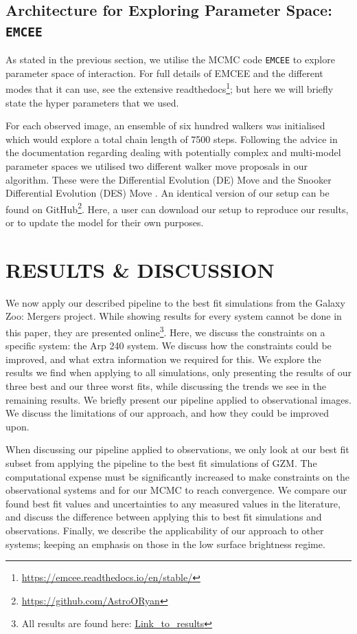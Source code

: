 \subsection{Architecture for Exploring Parameter Space: \texttt{EMCEE}}
As stated in the previous section, we utilise the MCMC code \texttt{EMCEE} \citep{Foreman-Mackey_13} to explore parameter space of interaction. For full details of EMCEE and the different modes that it can use, see the extensive readthedocs\footnote{\url{https://emcee.readthedocs.io/en/stable/}}; but here we will briefly state the hyper parameters that we used. 

For each observed image, an ensemble of six hundred walkers was initialised which would explore a total chain length of 7500 steps. Following the advice in the documentation regarding dealing with potentially complex and multi-model parameter spaces we utilised two different walker move proposals in our algorithm. These were the Differential Evolution (DE) Move \citep{Nelson_14} and the Snooker Differential Evolution (DES) Move \citep{ter_Braak_08}. An identical version of our setup can be found on GitHub\footnote{\url{https://github.com/AstroORyan}}. Here, a user can download our setup to reproduce our results, or to update the model for their own purposes.

\section{RESULTS \& DISCUSSION}\label{Results}
\noindent We now apply our described pipeline to the best fit simulations from the Galaxy Zoo: Mergers project. While showing results for every system cannot be done in this paper, they are presented online\footnote{All results are found here: \url{Link_to_results}}. Here, we discuss the constraints on a specific system: the Arp 240 system. We discuss how the constraints could be improved, and what extra information we required for this. We explore the results we find when applying to all simulations, only presenting the results of our three best and our three worst fits, while discussing the trends we see in the remaining results. We briefly present our pipeline applied to observational images. We discuss the limitations of our approach, and how they could be improved upon.

When discussing our pipeline applied to observations, we only look at our best fit subset from applying the pipeline to the best fit simulations of GZM. The computational expense must be significantly increased to make constraints on the observational systems and for our MCMC to reach convergence. We compare our found best fit values and uncertainties to any measured values in the literature, and discuss the difference between applying this to best fit simulations and observations. Finally, we describe the applicability of our approach to other systems; keeping an emphasis on those in the low surface brightness regime.

